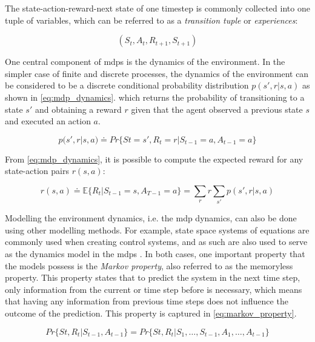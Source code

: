 \documentclass[../report.tex]{subfiles}
\begin{document}
The state-action-reward-next state of one timestep is commonly collected into one tuple of variables, which can be referred to as a \textit{transition tuple} or \textit{experiences}:

\begin{equation}
    (S_t, A_t, R_{t+1}, S_{t+1})
\end{equation}

One central component of \ac{mdp}s is the dynamics of the environment. In the simpler case of finite and discrete processes, the dynamics of the environment can be considered to be a discrete conditional probability distribution $p(s', r|s,a)$ as shown in \autoref{eq:mdp_dynamics}. which returns the probability of transitioning to a state $s'$ and obtaining a reward $r$ given that the agent observed a previous state $s$ and executed an action $a$.

\begin{equation} \label{eq:mdp_dynamics}
    p(s', r|s,a) \doteq Pr\{St=s', R_t=r|S_{t-1}=a,A_{t-1} =a\}
\end{equation}

From \autoref{eq:mdp_dynamics}, it is possible to compute the expected reward for any state-action pairs $r(s,a)$:

\begin{equation}
    r(s,a) \doteq \mathbb{E}\{R_t | S_{t-1}=s, A_{T-1}=a\} = \sum\limits_{r}r\sum\limits_{s'}p(s', r|s,a)
\end{equation}

Modelling the environment dynamics, i.e. the \ac{mdp} dynamics, can also be done using other modelling methods. For example, state space systems of equations are commonly used when creating control systems, and as such are also used to serve as the dynamics model in the \ac{mdp}s \cite{ss_example_1, ss_example_2, ss_example_3}. In both cases, one important property that the models possess is the \textit{Markov property}, also referred to as the memoryless property. This property states that to predict the system in the next time step, only information from the current or time step before is necessary, which means that having any information from previous time steps does not influence the outcome of the prediction. This property is captured in \autoref{eq:markov_property}.

\begin{equation} \label{eq:markov_property}
    Pr\{St, R_t|S_{t-1},A_{t-1}\} = Pr\{St, R_t|S_1, \dots, S_{t-1}, A_1, \dots, A_{t-1}\}
\end{equation}
\end{document}
